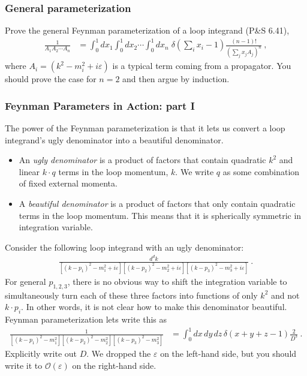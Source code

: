 \documentclass[12pt]{article}
\numberwithin{equation}{subsection}    %
\begin{document}
\subsubsection{General parameterization}
Prove the general Feynman parameterization of a loop integrand (P\&S 6.41),
\begin{align}
	\frac{1}{A_1A_2\cdots A_n}
	&= 
	\int_0^1dx_1\int_0^1dx_2\cdots \int_0^1dx_n
	\;
	\delta\left(\sum_i x_i -1\right)
	\frac{(n-1)!}{\left(\sum_j x_j A_j\right)^n}
	\ ,
\end{align}
where $A_i = (k^2 - m_i^2+i\varepsilon)$ is a typical term coming from a propagator. You should prove the case for $n=2$ and then argue by induction. 

\subsubsection{Feynman Parameters in Action: part I}

The power of the Feynman parameterization is that it lets us convert a loop integrand's ugly denominator into a beautiful denominator. 
\begin{itemize}	
\item An \emph{ugly denominator} is a product of factors that contain quadratic $k^2$ and linear $k\cdot q$ terms in the loop momentum, $k$. We write $q$ as some combination of fixed external momenta. 

\item A \emph{beautiful denominator} is a product of factors that only contain quadratic terms in the loop momentum. This means that it is spherically symmetric in integration variable. 
\end{itemize}	
Consider the following loop integrand with an ugly denominator:
\begin{align}
	\frac{d^dk}{
	[(k-p_1)^2 -m_1^2 +i\varepsilon]
	[(k-p_2)^2 -m_2^2 +i\varepsilon]
	[(k-p_3)^2 -m_3^2 +i\varepsilon]
	}\ .
\end{align}
For general $p_{1,2,3}$, there is no obvious way to shift the integration variable to simultaneously turn each of these three factors into functions of only $k^2$ and not $k\cdot p_i$. In other words, it is not clear how to make this denominator beautiful. Feynman parameterization lets write this as
\begin{align}
	\frac{1}{
	[(k-p_1)^2 -m_1^2]
	[(k-p_2)^2 -m_2^2]
	[(k-p_3)^2 -m_3^2]
	}
	&= \int_0^1 dx\,dy\,dz\,\delta(x+y+z-1)\frac{2}{D^3} \ .
\end{align}
Explicitly write out $D$. We dropped the $\varepsilon$ on the left-hand side, but you should write it to $\mathcal O(\varepsilon)$ on the right-hand side.
\end{document}
